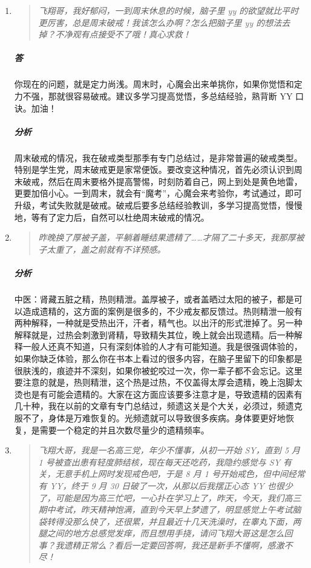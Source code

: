 \documentclass[fontset=founder]{ctexart}
\begin{document}
\begin{enumerate}
    \item \begin{quote}\it
        飞翔哥，我好郁闷，一到周末休息的时候，脑子里 yy 的欲望就比平时更厉害，总是周末破戒！我该怎么办啊？怎么把脑子里 yy 的想法去掉？不净观有点接受不了哦！真心求救！
    \end{quote}
    \subparagraph{答} 你现在的问题，就是定力尚浅。周末时，心魔会出来单挑你，如果你觉悟和定力不强，那就很容易破戒。建议多学习提高觉悟，多总结经验，熟背断 YY 口诀。加油！
    \subparagraph{分析} 周末破戒的情况，我在破戒类型那季有专门总结过，是非常普遍的破戒类型。特别是学生党，周末破戒更是家常便饭。要改变这种情况，首先必须认识到周末破戒，然后在周末要格外提高警惕，时刻防着自己，网上到处是黄色地雷，更要加倍小心。一到周末，就会有“魔考”，心魔会来考验你，考试通过，即可升级，考试失败就是破戒。破戒后要多总结经验教训，多学习提高觉悟，慢慢地，等有了定力后，自然可以杜绝周末破戒的情况。
    \item \begin{quote}\it
        昨晚换了厚被子盖，平躺着睡结果遗精了……才隔了二十多天，我那厚被子太重了，盖之前就有不详预感。
    \end{quote}
    \subparagraph{分析} 中医：肾藏五脏之精，热则精泄。盖厚被子，或者盖晒过太阳的被子，都是可以造成遗精的，这方面的案例是很多的，不少戒友都反馈过。热则精泄一般有两种解释，一种就是受热出汗，汗者，精气也。以出汗的形式泄掉了。另一种解释就是，过热会刺激到肾精，导致精失其位，晚上就会出现遗精。后一种解释一般人还真不知道，只有深刻体验的人才有可能知道。我是很强调体验的，如果你缺乏体验，那么你在书本上看过的很多内容，在脑子里留下的印象都是很肤浅的，痕迹并不深刻，如果你被蛇咬过一次，你一辈子都不会忘记。这里要注意的就是，热则精泄，这个热是过热，不仅盖得太厚会遗精，晚上泡脚太烫也是有可能会遗精的。大家在这方面应该要多注意才是，导致遗精的因素有几十种，我在以前的文章有专门总结过，频遗这关是个大关，必须过，频遗克服不了，身体是万难恢复的。光频遗就可以导致很多疾病。身体要更好地恢复，是需要一个稳定的并且次数尽量少的遗精频率。
    \item \begin{quote}\it
        飞翔大哥，我是一名高三党，年少不懂事，从初一开始 SY，直到 5 月 1 号被查出患有轻度肺结核，现在每天还吃药，我隐约感觉与 SY 有关，无意手机上网时发现戒色吧，于是 8 月 1 号开始戒色，但中间经常有 YY，终于 9 月 30 日破了一次，从那以后我摆正心态 YY 也很少了，可能是因为高三忙吧，一心扑在学习上了，昨天，今天，我们高三期中考试，昨天精神饱满，直到今天早上梦遗了，明显感觉上午考试脑袋转得没那么快了，还很累，并且最近十几天洗澡时，在睾丸下面，两腿之间的地方总感觉发痒，而且想用手挠，请问飞翔大哥这是怎么回事？我遗精正常么？看后一定要回答啊，我还是新手不懂啊，感激不尽！

\end{quote}
\end{enumerate}
\end{document}
